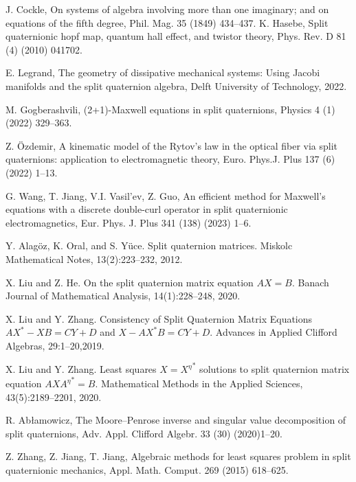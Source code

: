 \documentclass[preprint,12pt]{elsarticle}
\numberwithin{equation}{section}
\begin{document}
\begin{thebibliography}{99}

 J. Cockle, On systems of algebra involving more than one imaginary; and on equations of the fifth degree, Phil. Mag. 35 (1849) 434–437.
 K. Hasebe, Split quaternionic hopf map, quantum hall effect, and twistor theory, Phys. Rev. D 81 (4) (2010) 041702.

 E. Legrand, The geometry of dissipative mechanical systems: Using Jacobi manifolds and the split quaternion algebra, Delft University of
Technology, 2022.

 M. Gogberashvili, (2+1)-Maxwell equations in split quaternions, Physics 4 (1) (2022) 329–363.

 Z. Özdemir, A kinematic model of the Rytov's law in the optical fiber via split quaternions: application to electromagnetic theory, Euro. Phys.J. Plus 137 (6) (2022) 1–13.

 G. Wang, T. Jiang, V.I. Vasil'ev, Z. Guo, An efficient method for Maxwell's equations with a discrete double-curl operator in split quaternionic
electromagnetics, Eur. Phys. J. Plus 341 (138) (2023) 1–6.

 Y. Alag\"oz, K. Oral, and S. Y\"uce. Split quaternion matrices. Miskolc
Mathematical Notes, 13(2):223–232, 2012.

 X. Liu and Z. He. On the split quaternion matrix equation $AX= B$. Banach Journal
of Mathematical Analysis, 14(1):228–248, 2020.

 X. Liu and Y. Zhang. Consistency of Split Quaternion Matrix Equations $AX^* - XB = CY + D$ and $X - AX^*B = CY + D$. Advances in Applied Clifford Algebras, 29:1–20,2019.

 X. Liu and Y. Zhang. Least squares \(X = {X^{\eta}}^* \) solutions to split quaternion matrix equation \(AX{A^{\eta}}^*= B\). Mathematical Methods in the Applied Sciences, 43(5):2189–2201, 2020.

 R. Abłamowicz, The Moore–Penrose inverse and singular value decomposition of split quaternions, Adv. Appl. Clifford Algebr. 33 (30) (2020)1–20.

 Z. Zhang, Z. Jiang, T. Jiang, Algebraic methods for least squares problem in split quaternionic mechanics, Appl. Math. Comput. 269 (2015) 618–625.


\end{thebibliography}
\end{document}
